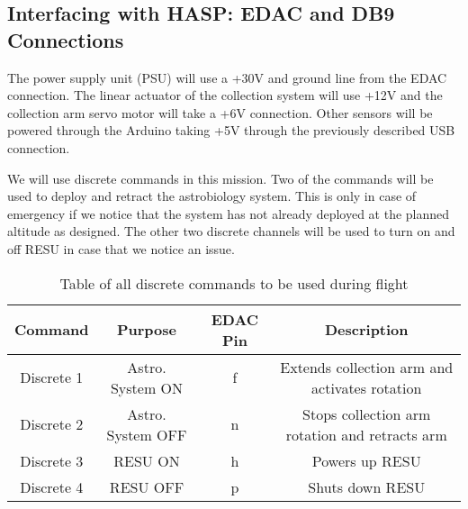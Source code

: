 \subsection{Interfacing with HASP: EDAC and DB9 Connections}

The power supply unit (PSU) will use a +30V and ground line from the EDAC connection. The linear actuator of the collection system will use +12V and the collection arm servo motor will take a +6V connection. Other sensors will be powered through the Arduino taking +5V through the previously described USB connection.  

We will use discrete commands in this mission. Two of the commands will be used to deploy and retract the astrobiology system. This is only in case of emergency if we notice that the system has not already deployed at the planned altitude as designed. The other two discrete channels will be used to turn on and off RESU in case that we notice an issue.

\begin{table}[!ht]
  \centering
  \caption{Table of all discrete commands to be used during flight} 
  \label{tab:Dis-Commands}
  \bigskip
  \begin{tabular}{cccc}
    \hline
    \hline
    \multicolumn{1}{c}{\bfseries Command} & \multicolumn{1}{c}{\bfseries Purpose} &  \multicolumn{1}{c}{\bfseries EDAC Pin} & \multicolumn{1}{c}{\bfseries Description} \\
    \hline
    Discrete 1 & Astro. System ON & f & Extends collection arm and activates rotation \\
    Discrete 2 & Astro. System OFF & n & Stops collection arm rotation and retracts arm \\
    Discrete 3 & RESU ON & h & Powers up RESU \\
    Discrete 4 & RESU OFF & p & Shuts down RESU \\
    \hline
    \hline
  \end{tabular}
  \medskip
\end{table}
